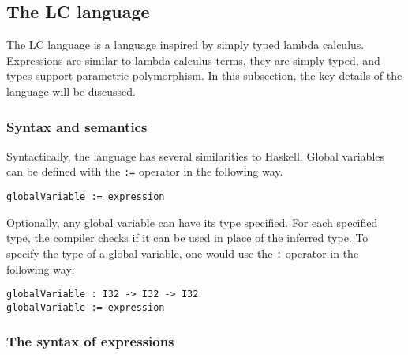 \documentclass[12pt]{article}
\begin{document}
\subsection{The LC language}

The LC language is a language inspired by simply typed lambda calculus.
Expressions are similar to lambda calculus terms, they are simply typed, and
types support parametric polymorphism. In this subsection, the key details of
the language will be discussed.

\subsubsection{Syntax and semantics}

Syntactically, the language has several similarities to Haskell. Global
variables can be defined with the \texttt{:=} operator in the following way.
\begin{verbatim}
globalVariable := expression
\end{verbatim}
Optionally, any global variable can have its type specified. For each specified
type, the compiler checks if it can be used in place of the inferred type. To
specify the type of a global variable, one would use the \texttt{:} operator in
the following way:
\begin{verbatim}
globalVariable : I32 -> I32 -> I32
globalVariable := expression
\end{verbatim}

\subsubsection{The syntax of expressions}
\end{document}
